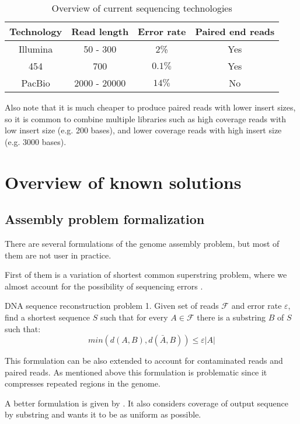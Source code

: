 \begin{table}[h]
\centering
\begin{tabular}{|c|c|c|c|}
\hline
Technology & Read length & Error rate & Paired end reads \\\hline
Illumina & 50 - 300 & 2\% & Yes\\\hline
454 & 700 & $0.1\%$ & Yes \\\hline
PacBio & 2000 - 20000 & $14\%$ & No \\\hline
\end{tabular}
\caption{Overview of current sequencing technologies}
\label{tab:techs}
\end{table}

Also note that it is much cheaper to produce paired reads with lower insert sizes,
so it is common to combine multiple libraries such as high coverage reads with low insert size
(e.g. 200 bases), and lower coverage reads with high insert size (e.g. 3000 bases).

\section{Overview of known solutions}

\subsection{Assembly problem formalization}

There are several formulations of the genome assembly problem, but
most of them are not user in practice.

First of them is a variation of shortest common superstring problem, where we
almost account for the possibility of sequencing errors \cite{kececioglu1995combinatorial}. 

\begin{definition}{DNA sequence reconstruction problem 1.}
Given set of reads $\mathcal{F}$ and error rate $\varepsilon$, find
a shortest sequence $S$ such that for every $A \in \mathcal{F}$ there is a substring
$B$ of $S$ such that:
$$min(d(A,B), d(\bar{A}, B)) \leq \varepsilon |A|$$
\end{definition}

This formulation can be also extended to account for contaminated reads and paired reads.
As mentioned above this formulation is problematic since it compresses repeated regions
in the genome.

A better formulation is given by \cite{myers1995toward}. It also considers
coverage of output sequence by substring and wants it to be as uniform as possible.

